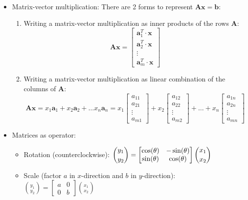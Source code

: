\documentclass[12pt]{article}
\begin{document}
\begin{itemize}
        \item Matrix-vector multiplication: There are 2 forms to represent $\mathbf{A}\mathbf{x} = \mathbf{b}$:
            \begin{enumerate}
                \item Writing a matrix-vector multiplication as inner products of the rows $\mathbf{A}$: 
                    $$\mathbf{A}\mathbf{x} = \begin{bmatrix} \mathbf{a}_{1}^T \cdot \mathbf{x} \\ \mathbf{a}_{2}^T \cdot \mathbf{x} \\ \vdots \\ \mathbf{a}_{m}^T\cdot \mathbf{x}\end{bmatrix}$$
                    \item Writing a matrix-vector multiplication as linear combination of the columns of $\mathbf{A}$:
                    $$\mathbf{A}\mathbf{x} = x_1\mathbf{a}_{1} + x_2\mathbf{a}_{2} + \dots x_n\mathbf{a}_{n} = x_1\begin{bmatrix}a_{11} \\ a_{21} \\ \vdots \\ a_{m1}\end{bmatrix} + x_2\begin{bmatrix}a_{12} \\ a_{22} \\ \vdots \\ a_{m2}\end{bmatrix} + \dots + x_n\begin{bmatrix}a_{1n} \\ a_{2n} \\ \vdots \\ a_{mn}\end{bmatrix}$$
            \end{enumerate}
        \item Matrices as operator:
            \begin{itemize}
                \item Rotation (counterclockwise): $\displaystyle {y_1 \choose y_2} = \begin{bmatrix} {\bf \cos(\theta)} & {\bf -\sin(\theta)} \\ {\bf \sin(\theta)} & {\bf \cos(\theta)} \end{bmatrix} {x_1 \choose x_2}$
                \item Scale (factor $a$ in $x$-direction and $b$ in $y$-direction): $\displaystyle {y_1 \choose y_2} = \begin{bmatrix} a & { 0} \\ { 0} & { b} \end{bmatrix} {x_1 \choose x_2}$

\end{itemize}
\end{itemize}
\end{document}
